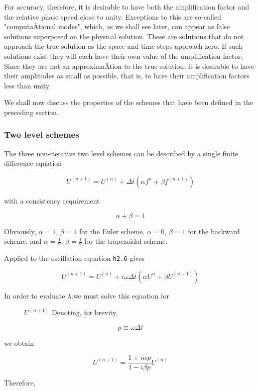 For accuracy, therefore, it is desirable to have both the amplification
factor and the relative phase speed close to unity. Exceptions to this
are so-called "computaÂ­tional modes", which, as we shall see later, can
appear as false solutions superposed on the physical solution. These are
solutions that do not approach the true solution as the space and time
steps approach zero. If such solutions exist they will each have their
own value of the amplification factor. Since they are not an
approximaÂ­tion to the true solution, it is desirable to have their
amplitudes as small as possible, that is, to have their amplification
factors less than unity.

We shall now discuss the properties of the schemes that have been
defined in the preceding section.

\subsubsection{Two level schemes}\label{two-level-schemes-1}

The three non-iterative two level schemes can be described by a single
finite difference equation

{\[U^{( n + 1 )} = U^{\left( n \right)} + \Delta t\left( \alpha f^{n} + \beta f^{\left( n + 1 \right)} \right)\]}

with a consistency requirement

\[\alpha + \beta = 1\]

Obviously, \(\alpha = 1\), \(\beta = 1\) for the Euler scheme,
\(\alpha = 0\), \(\beta = 1\) for the backward scheme, and
\(\alpha = \frac{1}{2}\), \(\beta = \frac{1}{2}\) for the trapezoidal
scheme.

Applied to the oscillation equation \texttt{h2.6} gives

{\[U^{\left( n + 1 \right)} = U^{(n)} + i\omega\Delta t \left( \alpha U^n  + \beta U^{( n + 1 )}\right)\]}

\begin{description}
\item[In order to evaluate \(\lambda\).we must solve this equation for]
\(U^{\left( n + 1 \right)}\) Denoting, for brevity,
\end{description}

{\[p \equiv \omega\Delta t\]}

we obtain

{\[U^{\left( n + 1 \right)} = \frac{1 + i\alpha p}{1 - i\beta p}U^{\left( n \right)}\]}

Therefore,

